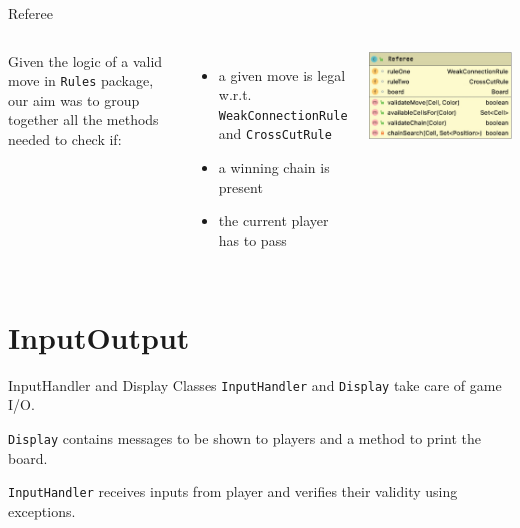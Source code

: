 \documentclass{beamer}
\begin{document}
\begin{frame}{Referee}
	\begin{columns}
	Given the logic of a valid move in \texttt{Rules} package, our aim was to group together all the methods needed to check if:
	\vspace{0.4cm}
	\begin{itemize}
		\item a given move is legal w.r.t. \texttt{WeakConnectionRule} and \texttt{CrossCutRule}
		\vspace{0.25cm}
		\item a winning chain is present
		\vspace{0.25cm}
		\item the current player has to pass
	\end{itemize}
	
	
		\includegraphics[scale=0.27]{images/referee-class.jpg}
	
	\end{columns}
\end{frame}



\section{InputOutput}

\begin{frame}{InputHandler and Display}
	Classes \texttt{InputHandler} and \texttt{Display} take care of game I/O.

	 \texttt{Display} contains messages to be shown to players and a method to print the board.
	
	 \texttt{InputHandler} receives inputs from player and verifies their validity using exceptions.  
\end{frame}
\end{document}
